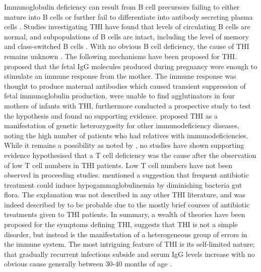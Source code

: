 \documentclass[12pt]{article}
\begin{document}
			Immunoglobulin deficiency can result from B cell precursors failing to either mature into B cells or further fail to differentiate into antibody secreting plasma cells \citep{Fiorilli86}. 
			Studies investigating THI have found that levels of circulating B cells are normal, and subpopulations of B cells are intact, including the level of memory and class-switched B cells \citep{Tiller78,Siegel81,Buckley83,Fiorilli86,Dressler89}.
			With no obvious B cell deficiency, the cause of THI remains unknown \citep{AlHerz14}. 
			The following mechanisms have been proposed for THI.
			\citet{Fudenberg64} proposed that the fetal IgG molecules produced during pregnancy were enough to stimulate an immune response from the mother. 
			The immune response was thought to produce maternal antibodies which caused transient suppression of fetal immunoglobulin production. 
			\citet{Rosen66} were unable to find agglutinators in four mothers of infants with THI, furthermore \citet{Nathenson71} conducted a prospective study to test the hypothesis and found no supporting evidence.
			\citet{Soothill68} proposed THI as a manifestation of genetic heterozygosity for other immunodeficiency diseases, noting the high number of patients who had relatives with immunodeficiencies.
			While it remains a possibility as noted by \citet{McGeady87}, no studies have shown supporting evidence \citep{Tiller78,Fiorilli86, Ovadia14}
			\citet{Siegel81} hypothesised that a T cell deficiency was the cause after the observation of low T cell numbers in THI patients.
			Low T cell numbers have not been observed in proceeding studies.
			\citet{McGeady87} mentioned a suggestion that frequent antibiotic treatment could induce hypogammaglobulinemia by diminishing bacteria gut flora. 
			The explanation was not described in any other THI literature, and was indeed described by \citet{McGeady87} to be probable due to the mostly brief courses of antibiotic treatments given to THI patients.
			In summary, a wealth of theories have been proposed for the symptoms defining THI, \citet{Dalal98} suggests that THI is not a simple disorder, but instead is the manifestation of a heterogeneous group of errors in the immune system.
			The most intriguing feature of THI is its self-limited nature; that gradually recurrent infections subside and serum IgG levels increase with no obvious cause generally between 30-40 months of age \citep{Tiller78,Soothill68,Siegel81,McGeady87,Dressler89,Kowalczyk97,Dalal98}. 
			
\end{document}
